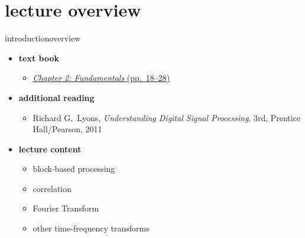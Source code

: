 

\subtitle{Part 3.2: Fundamentals II}


	

    \section[overview]{lecture overview}
        \begin{frame}{introduction}{overview}
            \begin{itemize}
                \item   \textbf{text book}  
                    \begin{itemize}
                        \item   \href{http://ieeexplore.ieee.org/xpl/ebooks/bookPdfWithBanner.jsp?fileName=6331119.pdf&bkn=6266785&pdfType=chapter}{\underline{\textit{Chapter 2: Fundamentals} (pp.~18--28)}}
                    \end{itemize}
                \item   \textbf{additional reading}  
                    \begin{itemize}
                        \item   Richard G.~Lyons, \textit{Understanding Digital Signal Processing}, 3rd, Prentice Hall/Pearson, 2011
                    \end{itemize}
                \bigskip
                \item<2->   \textbf{lecture content}
                    \begin{itemize}
                        \item<2->   block-based processing
                        \item<3->   correlation
                        \item<4->   Fourier Transform
                        \item<5->   other time-frequency transforms
                    \end{itemize}
            \end{itemize}
        \end{frame}

